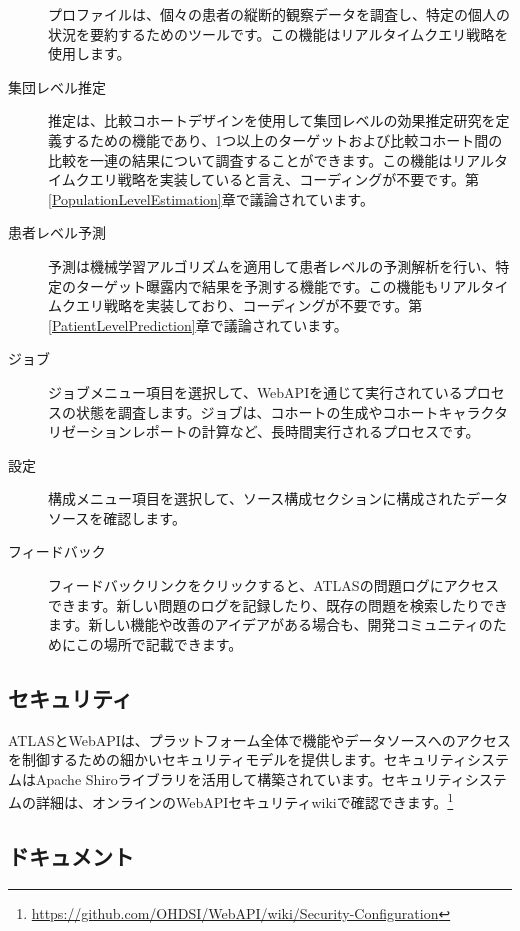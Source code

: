 \documentclass[
  11pt]{book}
\theoremstyle{definition}
\theoremstyle{definition}
\theoremstyle{definition}
\theoremstyle{definition}
\theoremstyle{remark}
\begin{document}
\begin{description}
プロファイルは、個々の患者の縦断的観察データを調査し、特定の個人の状況を要約するためのツールです。この機能はリアルタイムクエリ戦略を使用します。
\item[集団レベル推定 \index{ATLAS!集団レベル推定}]
推定は、比較コホートデザインを使用して集団レベルの効果推定研究を定義するための機能であり、1つ以上のターゲットおよび比較コホート間の比較を一連の結果について調査することができます。この機能はリアルタイムクエリ戦略を実装していると言え、コーディングが不要です。第\ref{PopulationLevelEstimation}章で議論されています。
\item[患者レベル予測 \index{ATLAS!患者レベル予測}]
予測は機械学習アルゴリズムを適用して患者レベルの予測解析を行い、特定のターゲット曝露内で結果を予測する機能です。この機能もリアルタイムクエリ戦略を実装しており、コーディングが不要です。第\ref{PatientLevelPrediction}章で議論されています。
\item[ジョブ \index{ATLAS!ジョブ}]
ジョブメニュー項目を選択して、WebAPIを通じて実行されているプロセスの状態を調査します。ジョブは、コホートの生成やコホートキャラクタリゼーションレポートの計算など、長時間実行されるプロセスです。
\item[設定 \index{ATLAS!設定}]
構成メニュー項目を選択して、ソース構成セクションに構成されたデータソースを確認します。
\item[フィードバック \index{ATLAS!フィードバック}]
フィードバックリンクをクリックすると、ATLASの問題ログにアクセスできます。新しい問題のログを記録したり、既存の問題を検索したりできます。新しい機能や改善のアイデアがある場合も、開発コミュニティのためにこの場所で記載できます。
\end{description}

\subsection{セキュリティ}\label{ux30bbux30adux30e5ux30eaux30c6ux30a3}

ATLASとWebAPIは、プラットフォーム全体で機能やデータソースへのアクセスを制御するための細かいセキュリティモデルを提供します。セキュリティシステムはApache Shiroライブラリを活用して構築されています。セキュリティシステムの詳細は、オンラインのWebAPIセキュリティwikiで確認できます。\footnote{\url{https://github.com/OHDSI/WebAPI/wiki/Security-Configuration}} 

\subsection{ドキュメント}\label{ux30c9ux30adux30e5ux30e1ux30f3ux30c8}
\end{document}
